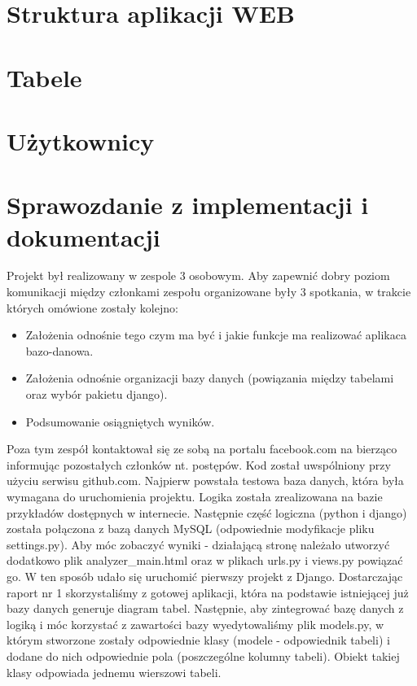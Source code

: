 \documentclass[a4paper]{article}
\begin{document}
\section{Struktura aplikacji WEB}


\section{Tabele}


\section{Użytkownicy}


\section{Sprawozdanie z implementacji i dokumentacji}
Projekt był realizowany w zespole 3 osobowym. Aby zapewnić dobry poziom komunikacji między członkami zespołu organizowane były 3 spotkania, w trakcie których omówione zostały kolejno:
\begin{itemize}
	\item Założenia odnośnie tego czym ma być i jakie funkcje ma realizować aplikaca bazo-danowa.
	\item Założenia odnośnie organizacji bazy danych (powiązania między tabelami oraz wybór pakietu django).
	\item Podsumowanie osiągniętych wyników.
\end{itemize}
Poza tym zespół kontaktował się ze sobą na portalu facebook.com na bierząco informując pozostałych członków nt. postępów. Kod został uwspólniony przy użyciu serwisu github.com. 
\newline
Najpierw powstała testowa baza danych, która była wymagana do uruchomienia projektu. Logika została zrealizowana na bazie przykładów dostępnych w internecie. Następnie część logiczna (python i django) została połączona z bazą danych MySQL (odpowiednie modyfikacje pliku settings.py). Aby móc zobaczyć wyniki - działającą stronę należało utworzyć dodatkowo plik analyzer\_main.html oraz w plikach urls.py i views.py powiązać go. W ten sposób udało się uruchomić pierwszy projekt z Django.
\newline
Dostarczając raport nr 1 skorzystaliśmy z gotowej aplikacji, która na podstawie istniejącej już bazy danych generuje diagram tabel. 
Następnie, aby zintegrować bazę danych z logiką i móc korzystać z zawartości bazy wyedytowaliśmy plik models.py, w którym stworzone zostały odpowiednie klasy (modele - odpowiednik tabeli) i dodane do nich odpowiednie pola (poszczególne kolumny tabeli). Obiekt takiej klasy odpowiada jednemu wierszowi tabeli. 
\end{document}
